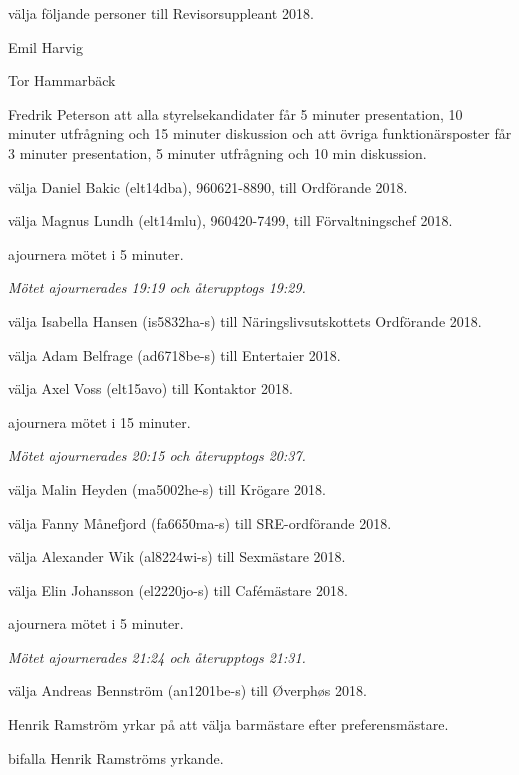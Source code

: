 \documentclass[10pt]{article}
\begin{document}
\begin{paragrafer}
\begin{paralist}
    \Mba välja följande personer till Revisorsuppleant 2018.
    \begin{tightdashlist}
        \item Emil Harvig
        \item Tor Hammarbäck
    \end{tightdashlist}


    Fredrik Peterson \ypa att alla styrelsekandidater får 5 minuter presentation, 10 minuter utfrågning och 15 minuter diskussion och att övriga funktionärsposter får 3 minuter presentation, 5 minuter utfrågning och 10 min diskussion.

    \Mba välja Daniel Bakic (elt14dba), 960621-8890, till Ordförande 2018.

    \Mba välja Magnus Lundh (elt14mlu), 960420-7499, till Förvaltningschef 2018.

    \Mba ajournera mötet i 5 minuter.

    \emph{Mötet ajournerades 19:19 och återupptogs 19:29.}

    \Mba välja Isabella Hansen (is5832ha-s) till Näringslivsutskottets Ordförande 2018.

    \Mba välja Adam Belfrage (ad6718be-s) till Entertaier 2018.

    \Mba välja Axel Voss (elt15avo) till Kontaktor 2018.

    \Mba ajournera mötet i 15 minuter.

    \emph{Mötet ajournerades 20:15 och återupptogs 20:37.}

    \Mba välja Malin Heyden (ma5002he-s) till Krögare 2018.

    \Mba välja Fanny Månefjord (fa6650ma-s) till SRE-ordförande 2018.

    \Mba välja Alexander Wik (al8224wi-s) till Sexmästare 2018.

    \Mba välja Elin Johansson (el2220jo-s) till Cafémästare 2018.

    \Mba ajournera mötet i 5 minuter.

    \emph{Mötet ajournerades 21:24 och återupptogs 21:31.}

    \Mba välja Andreas Bennström (an1201be-s) till Øverphøs 2018.


    Henrik Ramström yrkar på att välja barmästare efter preferensmästare.

    \Mba bifalla Henrik Ramströms yrkande.


\end{paralist}
\end{paragrafer}
\end{document}
